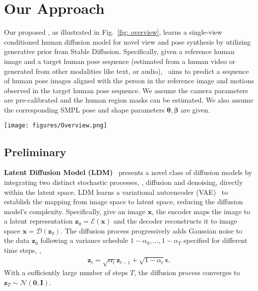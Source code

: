 \section{Our Approach}
Our proposed \nickname, as illustrated in Fig.~\ref{fig: overview}, learns a single-view conditioned human diffusion model for novel view and pose synthesis by utilizing generative prior from Stable Diffusion.
Specifically, given a reference human image and a target human pose sequence (estimated from a human video or generated from other modalities like text, or audio), \nickname\ aims to predict a sequence of human pose images aligned with the person in the reference image and motions observed in the target human pose sequence. 
We assume the camera parameters are pre-calibrated and the human region masks can be estimated. 
We also assume the corresponding SMPL pose and shape parameters $\bm{\theta}, \bm{\beta}$ are given.

\begin{figure*}[t]
    \centering
    \vspace{-6mm}
    \texttt{[image: figures/Overview.png]}
    \setlength{\abovecaptionskip}{0cm}
    \caption{\textbf{\nickname{} Framework}. Given a single input human image and a target pose sequence, our \nickname{} produces a sequence of target images aligned with the human subject in the input image and target human poses. To synthesize view-consistent and pose-consistent outputs, our \nickname{} proposes to incorporate generative prior, a Human NeRF module, image-level loss, multi-view attention, and temporal attention.} 
\label{fig: overview}
\vspace{-2mm}
\end{figure*}

\subsection{Preliminary}
\label{sec:preliminary}

\noindent \textbf{Latent Diffusion Model (LDM)}~\cite{rombach2022high} presents a novel class of diffusion models by integrating two distinct stochastic processes, \ie, diffusion and denoising, directly within the latent space.
LDM learns a variational autoencoder (VAE)~\cite{kingma2013auto, van2017neural} to establish the mapping from image space to latent space, reducing the diffusion model's complexity.
Specifically, give an image $\bm{x}$, the encoder maps the image to a latent representation $\bm{z}_0=\mathcal{E}(\bm{x})$ and the decoder reconstructs it to image space $\bm{x}=\mathcal{D}(\bm{z}_0)$. 
The diffusion process progressively adds Gaussian noise to the data $\bm{z}_0$ following a variance schedule $1-\alpha_{0}, \dots, 1-\alpha_{T}$ specified for different time steps, \ie,
\begin{equation}
\label{eqn:diffusion_process}
    \begin{aligned}
        \bm{z}_{t}=\sqrt{\alpha_t}\bm{z}_{t-1} + \sqrt{1-\alpha_t}\bm{\epsilon}.
    \end{aligned}
\end{equation}
With a sufficiently large number of steps $T$, the diffusion process converges to $\bm{z}_T\sim \mathcal{N}(\bm{0}, \bm{I})$. 

